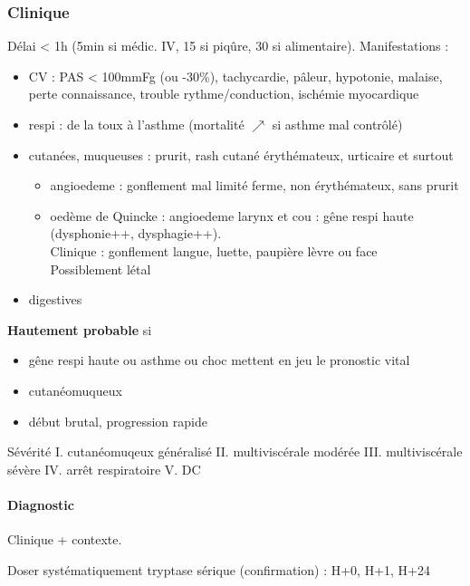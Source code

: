 \documentclass[11pt]{article}
\begin{document}
\subsubsection{Clinique}
\label{sec:org8fdfb67}
Délai < 1h (5min si médic. IV, 15 si piqûre, 30 si alimentaire).
Manifestations :

\begin{itemize}
\item CV : PAS < 100mmFg (ou -30\%), tachycardie, pâleur, hypotonie, malaise,
perte connaissance, trouble rythme/conduction, ischémie myocardique
\item respi : de la toux à l'asthme (mortalité \(\nearrow\) si asthme mal
contrôlé)
\item cutanées, muqueuses : prurit, rash cutané érythémateux, urticaire et
surtout 

\begin{itemize}
\item angioedeme : gonflement mal limité ferme, non érythémateux, sans
prurit
\item oedème de Quincke : angioedeme larynx et cou : gêne respi haute
(dysphonie++, dysphagie++). \\
Clinique : gonflement langue, luette, paupière lèvre ou face\\
Possiblement létal \faBomb
\end{itemize}

\item digestives
\end{itemize}

\textbf{Hautement probable}  si 

\begin{itemize}
\item gêne respi haute ou asthme ou choc
mettent en jeu le pronostic vital
\item cutanéomuqueux
\item début brutal, progression rapide
\end{itemize}

Sévérité
I. cutanéomuqeux généralisé
II. multiviscérale modérée
III. multiviscérale sévère
IV. arrêt respiratoire
V. DC


\paragraph{Diagnostic}
\label{sec:org4d32d72}
Clinique + contexte.

Doser systématiquement tryptase sérique (confirmation) : H+0, H+1, H+24
\end{document}
